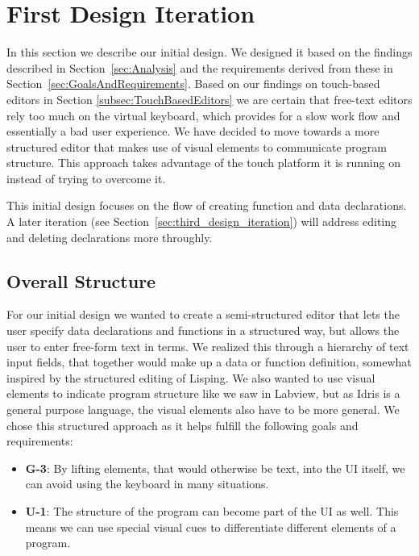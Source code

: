 \chapter{First Design Iteration}
\label{sec:InitialDesign}

In this section we describe our initial design. 
We designed it based on the findings described in Section~\ref{sec:Analysis} and the requirements derived from these in Section~\ref{sec:GoalsAndRequirements}.
Based on our findings on touch-based editors in Section \ref{subsec:TouchBasedEditors} we are certain that free-text editors rely too much on the virtual keyboard, which provides for a slow work flow and essentially a bad user experience.
We have decided to move towards a more structured editor that makes use of
visual elements to communicate program structure. This approach takes
advantage of the touch platform it is running on instead of trying to overcome
it.

This initial design focuses on the flow of creating function and data declarations. A later iteration (see Section~\ref{sec:third_design_iteration}) will address editing and deleting declarations more throughly.

\section{Overall Structure}
For our initial design we wanted to create a semi-structured editor that lets the user specify data declarations and functions in a structured way, but allows the user to enter free-form text
in terms.
We realized this through a hierarchy of text input fields, that together would make up a data or function definition, somewhat inspired by the structured editing of Lisping.
We also wanted to use visual elements to indicate program structure like we saw in Labview, but as Idris is a general purpose language, the visual elements also have to be more general.
We chose this structured approach as it helps fulfill the following goals and requirements:
\begin{itemize}
	\item \textbf{G-3}: By lifting elements, that would otherwise be text, into the UI itself, we can avoid using the keyboard in many situations.
	\item \textbf{U-1}: The structure of the program can become part of the UI as well. 
	This means we can use special visual cues to differentiate different elements of a program. 
\end{itemize}

